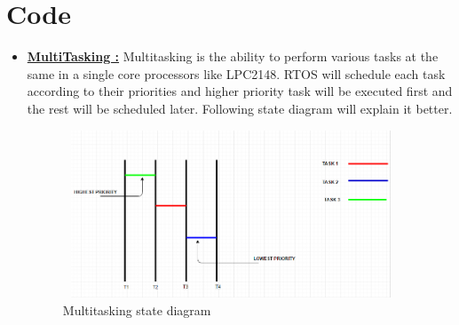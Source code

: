 \documentclass[a4paper,12pt,oneside]{book}
\begin{document}
\section{Code}
\begin{itemize}
  \item \textbf{\href{https://github.com/eYSIP-2016/RTOS_LPC2148/tree/master/Codes/Multitasking}{MultiTasking :}
}Multitasking is the ability to perform various tasks at the same in a single core processors like LPC2148. RTOS will schedule each task according to their priorities and higher priority task will be executed first and the rest will be scheduled later. Following state diagram will explain it better.
\begin{figure}[h]
\centering
\includegraphics[width=10cm,height=5cm]{multitasking_states.PNG}
\caption{Multitasking state diagram}
\end{figure}


\end{itemize}
\end{document}
